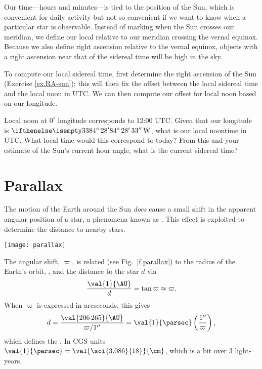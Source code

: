 Our time---hours and minutes---is tied to the position of the Sun, which is convenient for daily activity but not so convenient if we want to know when a particular star is observable.  Instead of marking when the Sun crosses our meridian, we define our local  relative to our meridian crossing the vernal equinox.  Because we also define right ascension relative to the vernal equinox, objects with a right ascension near that of the sidereal time will be high in the sky.

To compute our local sidereal time, first determine the right ascension of the Sun (Exercise \ref{ex.RA-sun}); this will then fix the offset between the local sidereal time and the local noon in UTC.  We can then compute our offset for local noon based on our longitude.

\begin{exercisebox}
Local noon at $0^{\circ}$ longitude corresponds to 12:00 UTC. Given that our longitude is $\dec{84}{28}{33}\,\mathrm{W}$, what is our local noontime in UTC.  What local time would this correspond to today? From this and your estimate of the Sun's current hour angle, what is the current sidereal time?
\end{exercisebox}

\section{Parallax}

The motion of the Earth around the Sun \emph{does} cause a small shift in the apparent angular position of a star, a phenomena known as .  This effect is exploited to determine the distance to nearby stars.  

\begin{figure*}[htb]
\texttt{[image: parallax]}
\caption[The parallax angle of a star]{The parallax angle $\varpi$ of a star induced by Earth's motion around the Sun.}
\label{f.parallax}
\end{figure*}

The angular shift, $\varpi$, is related (see Fig.~\ref{f.parallax}) to the radius of the Earth's orbit, , and the distance to the star $d$ via
\[
\frac{\val{1}{\AU}}{d} = \tan\varpi \approx \varpi.
\]
When $\varpi$ is expressed in arcseconds, this gives
\begin{equation}\label{e.parallax}
d = \frac{\val{206\,265}{\AU}}{\varpi/1''} = \val{1}{\parsec}\left(\frac{1''}{\varpi}\right) ,
\end{equation}
which defines the .  In CGS units $\val{1}{\parsec} = \val{\sci{3.086}{18}}{\cm}$, which is a bit over 3 light-years.

